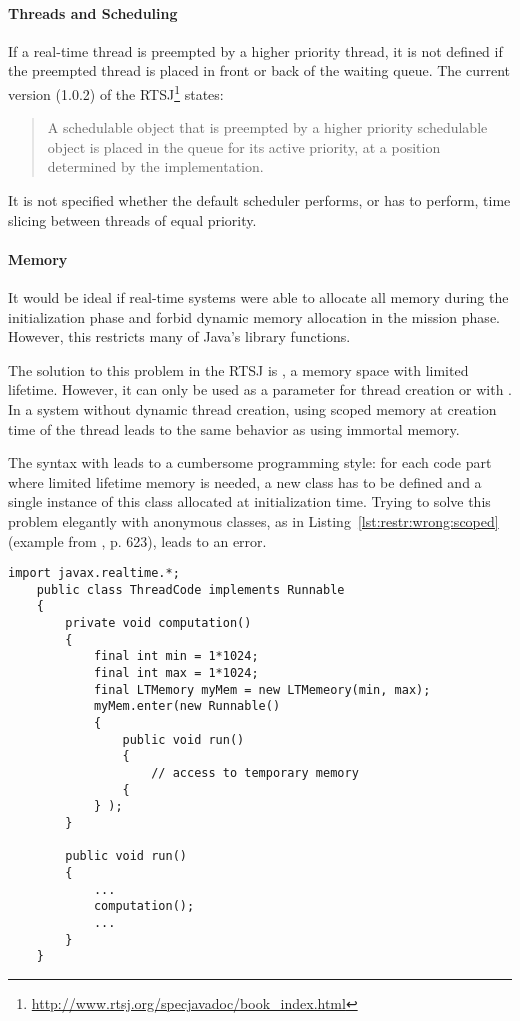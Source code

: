 \paragraph{Threads and Scheduling}

If a real-time thread is preempted by a higher priority thread, it
is not defined if the preempted thread is placed in front or back of
the waiting queue. The current version (1.0.2) of the
RTSJ\footnote{\url{http://www.rtsj.org/specjavadoc/book_index.html}}
states:
\begin{quote}
A schedulable object that is preempted by a higher priority
schedulable object is placed in the queue for its active priority,
at a position determined by the implementation.
\end{quote}
It is not specified whether the default scheduler performs, or has
to perform, time slicing between threads of equal priority.

\paragraph{Memory}


It would be ideal if real-time systems were able to allocate all
memory during the initialization phase and forbid dynamic memory
allocation in the mission phase. However, this restricts many of
Java's library functions.


The solution to this problem in the RTSJ is , a
memory space with limited lifetime. However, it can only be used as
a parameter for thread creation or with . In
a system without dynamic thread creation, using scoped memory at
creation time of the thread leads to the same behavior as using
immortal memory.

The syntax with  leads to a cumbersome programming
style: for each code part where limited lifetime memory is needed, a
new class has to be defined and a single instance of this class
allocated at initialization time. Trying to solve this problem
elegantly with anonymous classes, as in
Listing~\ref{lst:restr:wrong:scoped} (example from \cite{558498}, p.
623), leads to an error.

\begin{lstlisting}[float,caption={Scoped memory usage with a memory leak},label=lst:restr:wrong:scoped]
    import javax.realtime.*;
    public class ThreadCode implements Runnable
    {
        private void computation()
        {
            final int min = 1*1024;
            final int max = 1*1024;
            final LTMemory myMem = new LTMemeory(min, max);
            myMem.enter(new Runnable()
            {
                public void run()
                {
                    // access to temporary memory
                {
            } );
        }

        public void run()
        {
            ...
            computation();
            ...
        }
    }
\end{lstlisting}


